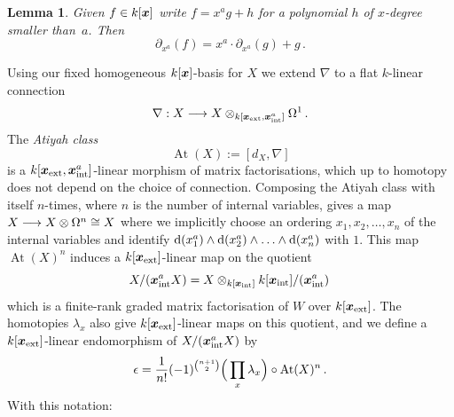 \documentclass{compositio}
\newtheorem{lemma}[theorem]{Lemma}
\theoremstyle{definition}
\numberwithin{equation}{section}
\DeclareMathOperator{\At}{At}
\begin{document}
\begin{lemma}\label{lemma:division_woremainder} Given $f \in k[\boldsymbol{x}]$ write $f = x^a g + h$ for a polynomial $h$ of $x$-degree smaller than~$a$. Then
\[
\partial_{x^a}(f) = x^a \cdot \partial_{x^a}(g) + g\,.
\]
\end{lemma}

Using our fixed homogeneous $k[\boldsymbol{x}]$-basis for $X$ we extend $\nabla$ to a flat $k$-linear connection
\[
\nabla: X \longrightarrow X \otimes_{k[\boldsymbol{x}_{\textup{ext}},\boldsymbol{x}_{\textup{int}}^a]} \Omega^1\,.
\]
The \emph{Atiyah class} 
\begin{equation}
\label{Atiyahclass}
\At(X) := [d_X, \nabla]
\end{equation}
is a $k[\boldsymbol{x}_{\textup{ext}},\boldsymbol{x}_{\textup{int}}^a]$-linear morphism of matrix factorisations, which up to homotopy does not depend on the choice of connection. Composing the Atiyah class with itself $n$-times, where $n$ is the number of internal variables, gives a map $X \longrightarrow X \otimes \Omega^n \cong X$ where we implicitly choose an ordering $x_1, x_2, \ldots,x_n$ of the internal variables and identify $\mathrm{d}(x_1^a) \wedge \mathrm{d}(x_2^a) \wedge \ldots \wedge \mathrm{d}(x_n^a)$ with $1$. This map $\At(X)^n$ induces a $k[\boldsymbol{x}_{\textup{ext}}]$-linear map on the quotient
\[
X/(\boldsymbol{x}_{\textup{int}}^a X) = X \otimes_{k[\boldsymbol{x}_{\textup{int}}]} k[\boldsymbol{x}_{\textup{int}}]/(\boldsymbol{x}_{\textup{int}}^a)\,
\]
which is a finite-rank graded matrix factorisation of $W$ over $k[\boldsymbol{x}_{\textup{ext}}]$. The homotopies $\lambda_x$ also give $k[\boldsymbol{x}_{\textup{ext}}]$-linear maps on this quotient, and we define a $k[\boldsymbol{x}_{\textup{ext}}]$-linear endomorphism of $X/(\boldsymbol{x}_{\textup{int}}^a X)$ by
\begin{equation}
\idem = \frac{1}{n!}(-1)^{\binom{n+1}{2}} \Big(\prod_x \lambda_x \Big) \circ \At(X)^n\,.
\end{equation}
With this notation:
\end{document}
